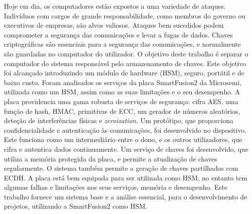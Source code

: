 \noindent Hoje em dia, os computadores estão expostos a uma variedade de ataques. Indivíduos com cargos de grande responsabilidade, como membros do governo ou executivos de empresas, são alvos valiosos. Ataques bem sucedidos podem comprometer a segurança das comunicações e levar a fugas de dados. Chaves criptográficas são essenciais para a segurança das comunicações, e normalmente são guardadas no computador do utilizador. O objetivo deste trabalho é separar o computador do sistema responsável pelo armazenamento de chaves. Este objetivo foi alcançado introduzindo um módulo de hardware (HSM), seguro, portátil e de baixo custo. Foram analisados os serviços da placa SmartFusion2 da Microsemi, utilizada como um HSM, assim como as suas limitações e o seu desempenho. A placa providencia uma gama robusta de serviços de segurança: cifra AES, uma função de hash, HMAC, primitivas de ECC, um gerador de números aleatórios, deteção de interferências físicas e \textit{zeroization}. Um protótipo, que proporciona confidencialidade e autenticação às comunicações, foi desenvolvido no dispositivo. Este funciona como um intermediário entre o dono, e os outros utilizadores, que cifra e autentica dados continuamente. Um serviço de chaves foi desenvolvido, que utiliza a memória protegida da placa, e permite a atualização de chaves regularmente. O sistema também permite a geração de chaves partilhadas com ECDH. A placa está bem equipada para ser utilizada como HSM, no entanto tem algumas falhas e limitações nos seus serviços, memória e desempenho. Este trabalho fornece um sistema base e a análise essencial, para o desenvolvimento de projetos, utilizando a SmartFusion2 como HSM.
